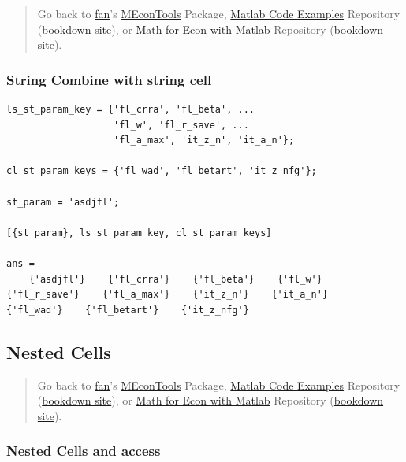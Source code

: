 \documentclass[
]{book}
\begin{document}
\begin{quote}
Go back to \href{http://fanwangecon.github.io/}{fan}'s \href{https://fanwangecon.github.io/MEconTools/}{MEconTools} Package, \href{https://fanwangecon.github.io/M4Econ/}{Matlab Code Examples} Repository (\href{https://fanwangecon.github.io/M4Econ/bookdown}{bookdown site}), or \href{https://fanwangecon.github.io/Math4Econ/}{Math for Econ with Matlab} Repository (\href{https://fanwangecon.github.io/Math4Econ/bookdown}{bookdown site}).
\end{quote}

\hypertarget{string-combine-with-string-cell}{%
\subsubsection{String Combine with string cell}\label{string-combine-with-string-cell}}

\begin{verbatim}
ls_st_param_key = {'fl_crra', 'fl_beta', ...
                   'fl_w', 'fl_r_save', ...
                   'fl_a_max', 'it_z_n', 'it_a_n'};

cl_st_param_keys = {'fl_wad', 'fl_betart', 'it_z_nfg'};

st_param = 'asdjfl';

[{st_param}, ls_st_param_key, cl_st_param_keys]

ans = 
    {'asdjfl'}    {'fl_crra'}    {'fl_beta'}    {'fl_w'}    {'fl_r_save'}    {'fl_a_max'}    {'it_z_n'}    {'it_a_n'}    {'fl_wad'}    {'fl_betart'}    {'it_z_nfg'}
\end{verbatim}

\hypertarget{nested-cells}{%
\subsection{Nested Cells}\label{nested-cells}}

\begin{quote}
Go back to \href{http://fanwangecon.github.io/}{fan}'s \href{https://fanwangecon.github.io/MEconTools/}{MEconTools} Package, \href{https://fanwangecon.github.io/M4Econ/}{Matlab Code Examples} Repository (\href{https://fanwangecon.github.io/M4Econ/bookdown}{bookdown site}), or \href{https://fanwangecon.github.io/Math4Econ/}{Math for Econ with Matlab} Repository (\href{https://fanwangecon.github.io/Math4Econ/bookdown}{bookdown site}).
\end{quote}

\hypertarget{nested-cells-and-access}{%
\subsubsection{Nested Cells and access}\label{nested-cells-and-access}}
\end{document}
